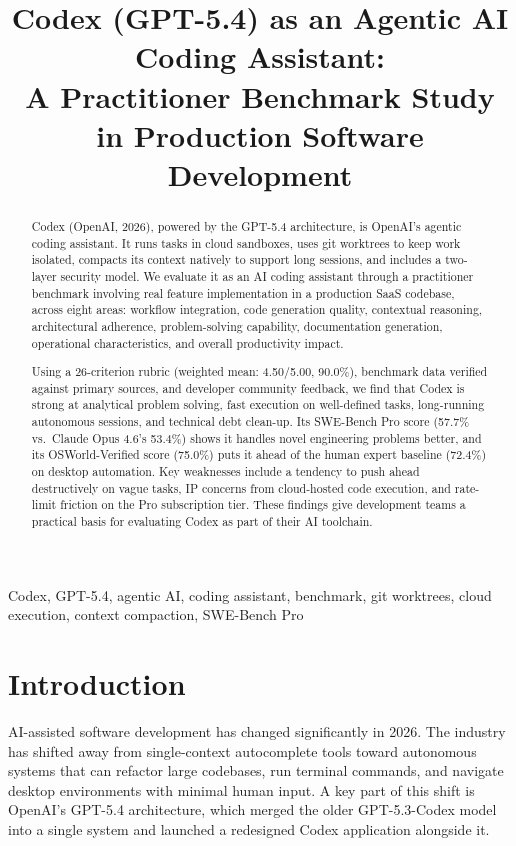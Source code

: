 \documentclass[conference]{IEEEtran}
\begin{document}
\title{Codex (GPT-5.4) as an Agentic AI Coding Assistant:\\A Practitioner Benchmark Study in Production Software Development}

\author{
}

\maketitle

\begin{abstract}
Codex (OpenAI, 2026), powered by the GPT-5.4 architecture, is OpenAI's agentic coding assistant. It runs tasks in cloud sandboxes, uses git worktrees to keep work isolated, compacts its context natively to support long sessions, and includes a two-layer security model. We evaluate it as an AI coding assistant through a practitioner benchmark involving real feature implementation in a production SaaS codebase, across eight areas: workflow integration, code generation quality, contextual reasoning, architectural adherence, problem-solving capability, documentation generation, operational characteristics, and overall productivity impact.

Using a 26-criterion rubric (weighted mean: 4.50/5.00, 90.0\%), benchmark data verified against primary sources, and developer community feedback, we find that Codex is strong at analytical problem solving, fast execution on well-defined tasks, long-running autonomous sessions, and technical debt clean-up. Its SWE-Bench Pro score (57.7\% vs.\ Claude Opus 4.6's 53.4\%) shows it handles novel engineering problems better, and its OSWorld-Verified score (75.0\%) puts it ahead of the human expert baseline (72.4\%) on desktop automation. Key weaknesses include a tendency to push ahead destructively on vague tasks, IP concerns from cloud-hosted code execution, and rate-limit friction on the Pro subscription tier. These findings give development teams a practical basis for evaluating Codex as part of their AI toolchain.
\end{abstract}

\begin{IEEEkeywords}
Codex, GPT-5.4, agentic AI, coding assistant, benchmark, git worktrees, cloud execution, context compaction, SWE-Bench Pro
\end{IEEEkeywords}

\section{Introduction}
AI-assisted software development has changed significantly in 2026. The industry has shifted away from single-context autocomplete tools toward autonomous systems that can refactor large codebases, run terminal commands, and navigate desktop environments with minimal human input. A key part of this shift is OpenAI's GPT-5.4 architecture, which merged the older GPT-5.3-Codex model into a single system and launched a redesigned Codex application alongside it.
\end{document}
